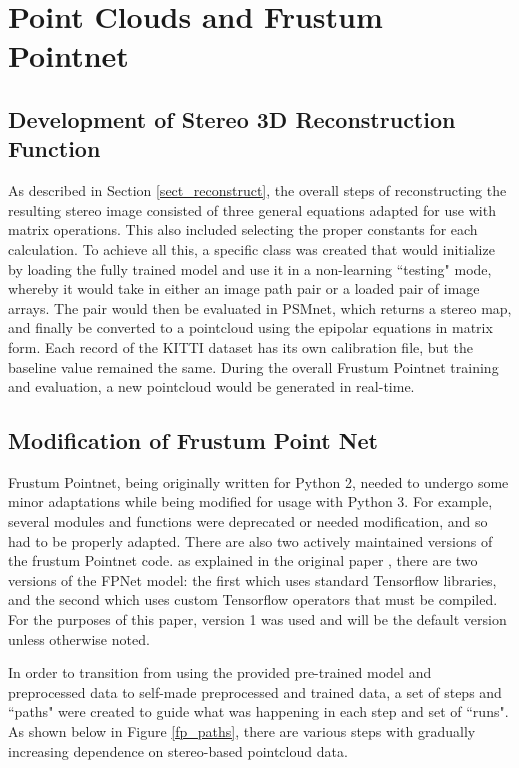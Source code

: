 \section{Point Clouds and Frustum Pointnet} %
\label{sect_fpnet}
\subsection{Development of Stereo 3D Reconstruction Function}
As described in Section \ref{sect_reconstruct}, the overall steps of reconstructing the resulting stereo image consisted of three general equations adapted for use with matrix operations. This also included selecting the proper constants for each calculation. To achieve all this, a specific class was created that would initialize by loading the fully trained model and use it in a non-learning ``testing" mode, whereby it would take in either an image path pair or a loaded pair of image arrays. The pair would then be evaluated in PSMnet, which returns a stereo map, and finally be converted to a pointcloud using the epipolar equations in matrix form. Each record of the KITTI dataset has its own calibration file, but the baseline value remained the same. During the overall Frustum Pointnet training and evaluation, a new pointcloud would be generated in real-time.

\subsection{Modification of Frustum Point Net}
Frustum Pointnet, being originally written for Python 2, needed to undergo some minor adaptations while being modified for usage with Python 3. For example, several modules and functions were deprecated or needed modification, and so had to be properly adapted. There are also two actively maintained versions of the frustum Pointnet code. as explained in the original paper \cite{qi_frustum_2017}, there are two versions of the FPNet model: the first which uses standard Tensorflow libraries, and the second which uses custom Tensorflow operators that must be compiled. For the purposes of this paper, version 1 was used and will be the default version unless otherwise noted.

In order to transition from using the provided pre-trained model and preprocessed data to self-made preprocessed and trained data, a set of steps and ``paths" were created to guide what was happening in each step and set of ``runs". As shown below in Figure \ref{fp_paths}, there are various steps with gradually increasing dependence on stereo-based pointcloud data.

